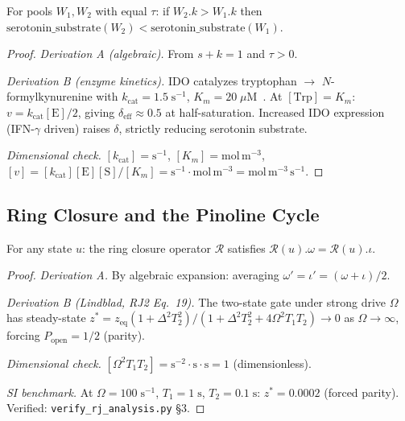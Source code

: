 \begin{theorem}
\label{thm:diversion}
For pools $W_1, W_2$ with equal $\tau$: if $W_2.k > W_1.k$ then
$\mathrm{serotonin\_substrate}(W_2) < \mathrm{serotonin\_substrate}(W_1)$.

\begin{proof}
\emph{Derivation A (algebraic).} From $s + k = 1$ and $\tau > 0$.

\emph{Derivation B (enzyme kinetics).}
IDO catalyzes tryptophan $\to$ $N$-formylkynurenine with
$k_\mathrm{cat} = 1.5\;\mathrm{s^{-1}}$,
$K_m = 20\;\mu\mathrm{M}$~\cite{sono96}.
At $[\mathrm{Trp}] = K_m$: $v = k_\mathrm{cat}[\mathrm{E}]/2$,
giving $\delta_\mathrm{eff} \approx 0.5$ at half-saturation.
Increased IDO expression (IFN-$\gamma$ driven) raises $\delta$,
strictly reducing serotonin substrate.

\emph{Dimensional check.}
$[k_\mathrm{cat}] = \mathrm{s^{-1}}$, $[K_m] = \mathrm{mol\,m^{-3}}$,
$[v] = [k_\mathrm{cat}][\mathrm{E}][\mathrm{S}]/[K_m] = \mathrm{s^{-1}\cdot mol\,m^{-3}} = \mathrm{mol\,m^{-3}\,s^{-1}}$. \checkmark
\qedhere
\end{proof}
\end{theorem}

\subsection{Ring Closure and the Pinoline Cycle}

\begin{theorem}
For any state $u$: the ring closure operator $\mathcal{R}$ satisfies
$\mathcal{R}(u).\omega = \mathcal{R}(u).\iota$.

\begin{proof}
\emph{Derivation A.} By algebraic expansion: averaging $\omega' = \iota' = (\omega+\iota)/2$.

\emph{Derivation B (Lindblad, RJ2 Eq.~19).}
The two-state gate under strong drive $\Omega$ has steady-state
$z^* = z_\mathrm{eq}(1+\Delta^2T_2^2)/(1+\Delta^2T_2^2+4\Omega^2T_1T_2) \to 0$
as $\Omega\to\infty$, forcing $P_\mathrm{open} = 1/2$ (parity).

\emph{Dimensional check.}
$[\Omega^2 T_1 T_2] = \mathrm{s^{-2}\cdot s\cdot s} = 1$ (dimensionless). \checkmark

\emph{SI benchmark.}
At $\Omega = 100\;\mathrm{s^{-1}}$, $T_1 = 1\;\mathrm{s}$, $T_2 = 0.1\;\mathrm{s}$:
$z^* = 0.0002$ (forced parity). Verified: \texttt{verify\_rj\_analysis.py} \S3.
\qedhere
\end{proof}
\end{theorem}

